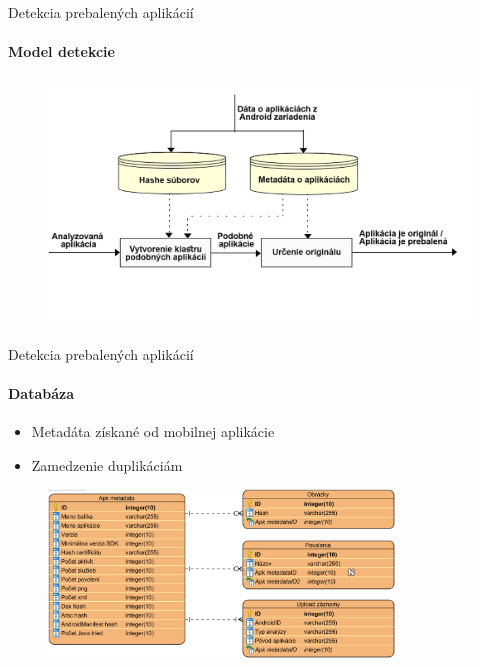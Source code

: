 \documentclass{beamer}
\begin{document}
    \begin{frame}[label=lists]{Detekcia prebalených aplikácií}
 	 \framesubtitle{Model detekcie}
		\begin{figure}[htb]
	  	\begin{center}
    		\includegraphics[height=6.5cm]{images/detection-overview.png}
  		\end{center}
	\end{figure}
  \end{frame}   
  
  \begin{frame}[label=lists]{Detekcia prebalených aplikácií}
 	 \framesubtitle{Databáza}
		\begin{itemize}
			\item Metadáta získané od mobilnej aplikácie
			\item Zamedzenie duplikáciám
		\end{itemize}
		\begin{figure}[htb]
	  	\begin{center}
    		\includegraphics[height=4.5cm]{images/detection-db-erd.png}
  		\end{center}
	\end{figure}
  \end{frame}   
  
\end{document}
